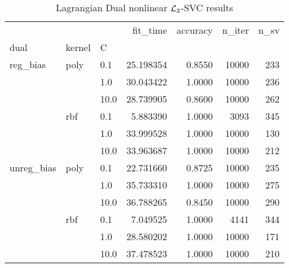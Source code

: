 \begin{table}[H]
\centering
\caption{Lagrangian Dual nonlinear $\protect \mathcal{L}_2$-SVC results}
\label{nonlinear_lagrangian_dual_l2_svc_cv_results}
\begin{tabular}{lllrrrr}
\toprule
           &     &      &   fit\_time &  accuracy &  n\_iter &  n\_sv \\
dual & kernel & C &            &           &         &       \\
\midrule
reg\_bias & poly & 0.1  &  25.198354 &    0.8550 &   10000 &   233 \\
           &     & 1.0  &  30.043422 &    1.0000 &   10000 &   236 \\
           &     & 10.0 &  28.739905 &    0.8600 &   10000 &   262 \\
           & rbf & 0.1  &   5.883390 &    1.0000 &    3093 &   345 \\
           &     & 1.0  &  33.999528 &    1.0000 &   10000 &   130 \\
           &     & 10.0 &  33.963687 &    1.0000 &   10000 &   212 \\
unreg\_bias & poly & 0.1  &  22.731660 &    0.8725 &   10000 &   235 \\
           &     & 1.0  &  35.733310 &    1.0000 &   10000 &   275 \\
           &     & 10.0 &  36.788265 &    0.8450 &   10000 &   290 \\
           & rbf & 0.1  &   7.049525 &    1.0000 &    4141 &   344 \\
           &     & 1.0  &  28.580202 &    1.0000 &   10000 &   171 \\
           &     & 10.0 &  37.478523 &    1.0000 &   10000 &   210 \\
\bottomrule
\end{tabular}
\end{table}
